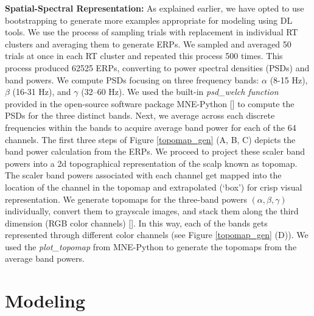 \documentclass{article}
\begin{document}
\textbf{Spatial-Spectral Representation:} As explained earlier, we have opted to use bootstrapping to generate more examples appropriate for modeling using DL tools. We use the process of sampling trials with replacement in individual RT clusters and averaging them to generate ERPs. We sampled and averaged 50 trials at once in each RT cluster and repeated this process 500 times. This process produced 62525 ERPs, converting to power spectral densities (PSDs) and band powers. We compute PSDs focusing on three frequency bands: $\alpha$ (8-15 Hz), $\beta$ (16-31 Hz), and $\gamma$ (32–60 Hz). We used the built-in \emph{psd\_welch function}  provided in the open-source software package MNE-Python [\cite{mne}] to compute the PSDs for the three distinct bands. Next, we average across each discrete frequencies within the bands to acquire average band power for each of the 64 channels. The first three steps of Figure \ref{topomap_gen} (A, B, C) depicts the band power calculation from the ERPs. We proceed to project these scaler band powers into a 2d topographical representation of the scalp known as topomap. The scaler band powers associated with each channel get mapped into the location of the channel in the topomap and extrapolated (‘box’) for crisp visual representation. We generate topomaps for the three-band powers $(\alpha, \beta, \gamma)$ individually, convert them to grayscale images, and stack them along the third dimension (RGB color channels) [\cite{bashivan2015}]. In this way, each of the bands gets represented through different color channels (see Figure \ref{topomap_gen} (D)). We used the \emph{plot\_topomap} from MNE-Python to generate the topomaps from the average band powers.

\section{Modeling}
\end{document}

